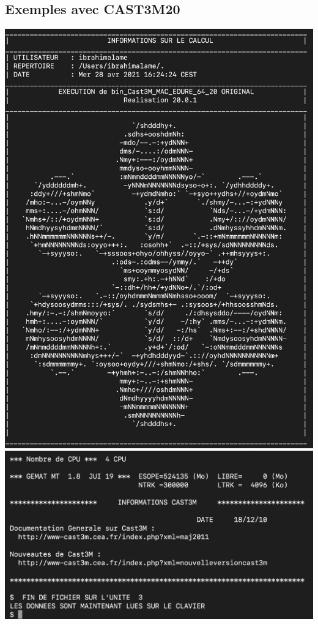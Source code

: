 \documentclass{article}
\begin{document}
\subsection*{Exemples  avec CAST3M20}
\includegraphics[scale=0.25]{castemVideo02.png} 
\includegraphics[scale=0.25]{castemVideo03.png} 
\end{document}
